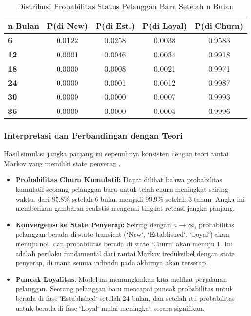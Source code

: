 \documentclass[a4paper,12pt]{article}
\begin{document}
\begin{table}[h]
\centering
\caption{Distribusi Probabilitas Status Pelanggan Baru Setelah n Bulan}
\label{tab:pn_results}
\begin{tabular}{l|cccc}
\hline
\textbf{n Bulan} & \textbf{P(di New)} & \textbf{P(di Est.)} & \textbf{P(di Loyal)} & \textbf{P(di Churn)} \\
\hline
\textbf{6} & 0.0122 & 0.0258 & 0.0038 & 0.9583 \\
\textbf{12} & 0.0001 & 0.0046 & 0.0034 & 0.9918 \\
\textbf{18} & 0.0000 & 0.0008 & 0.0021 & 0.9971 \\
\textbf{24} & 0.0000 & 0.0001 & 0.0012 & 0.9987 \\
\textbf{30} & 0.0000 & 0.0000 & 0.0007 & 0.9993 \\
\textbf{36} & 0.0000 & 0.0000 & 0.0004 & 0.9996 \\
\hline
\end{tabular}
\end{table}

\subsubsection{Interpretasi dan Perbandingan dengan Teori}
Hasil simulasi jangka panjang ini sepenuhnya konsisten dengan teori rantai Markov yang memiliki state penyerap \citep{norris1998markov}.
\begin{itemize}
    \item \textbf{Probabilitas Churn Kumulatif:} Dapat dilihat bahwa probabilitas kumulatif seorang pelanggan baru untuk telah churn meningkat seiring waktu, dari $95.8\%$ setelah 6 bulan menjadi $99.9\%$ setelah 3 tahun. Angka ini memberikan gambaran realistis mengenai tingkat retensi jangka panjang.
    \item \textbf{Konvergensi ke State Penyerap:} Seiring dengan $n \to \infty$, probabilitas pelanggan berada di state transient (`New`, `Established`, `Loyal`) akan menuju nol, dan probabilitas berada di state `Churn` akan menuju 1. Ini adalah perilaku fundamental dari rantai Markov ireduksibel dengan state penyerap, di mana semua individu pada akhirnya akan terserap.
    \item \textbf{Puncak Loyalitas:} Model ini memungkinkan kita melihat perjalanan pelanggan. Seorang pelanggan baru mencapai puncak probabilitas untuk berada di fase `Established` setelah 24 bulan, dan setelah itu probabilitas untuk berada di fase `Loyal` mulai meningkat secara signifikan.
\end{itemize}
\end{document}
